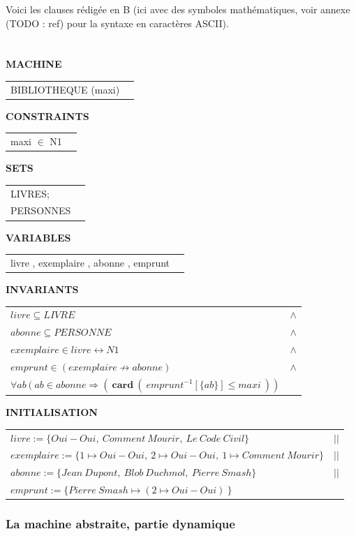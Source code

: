\documentclass[10pt,a4paper]{article}
\begin{document}
Voici les clauses rédigée en B (ici avec des symboles mathématiques, voir annexe (TODO : ref) pour la syntaxe en caractères ASCII).
\\
\\
\\
\setlength{\LTpre}{\medskipamount} %
\setlength{\LTpost}{0pt}
\setlength\LTleft{\parindent}
\textbf{MACHINE}
\begin{longtable}{ll} BIBLIOTHEQUE (maxi) \end{longtable}
\noindent\textbf{CONSTRAINTS}
\begin{longtable}{ll} maxi $\in$ N1 \end{longtable}
\noindent\textbf{SETS}
\begin{longtable}{ll} LIVRES; \\ PERSONNES\\ \end{longtable}
\noindent\textbf{VARIABLES}
\begin{longtable}{ll} livre , exemplaire , abonne , emprunt \end{longtable}
\noindent\textbf{INVARIANTS}
\begin{longtable}{ll}
$livre \subseteq LIVRE $ & $\wedge$ \tabularnewline
$abonne \subseteq PERSONNE$ & $\wedge$ \tabularnewline
$exemplaire \in livre \leftrightarrow N1$ & $\wedge$ \tabularnewline
$emprunt \in ( exemplaire \nrightarrow abonne )$ & $\wedge$ \tabularnewline
$\forall ab\ (\ ab \in abonne \Rightarrow (\ \textbf{card}\ (\ emprunt ^{-1}[\{ab\}] \leq maxi\ ))$ &
\end{longtable}
\noindent\textbf{INITIALISATION}
\begin{longtable}{ll}
$livre := \{Oui-Oui,\ Comment\ Mourir,\ Le\ Code\ Civil\} $& $||$ \tabularnewline
$exemplaire := \{1 \mapsto Oui-Oui,\ 2 \mapsto Oui-Oui,\ 1 \mapsto Comment\ Mourir\}$ & $||$ \tabularnewline
$abonne := \{Jean\ Dupont,\ Blob\ Duchmol,\ Pierre\ Smash\} $& $||$ \tabularnewline
$emprunt := \{Pierre\ Smash \mapsto ( 2 \mapsto Oui-Oui)\ \}$ &
\end{longtable}

\subsubsection{La machine abstraite, partie dynamique}
\end{document}
